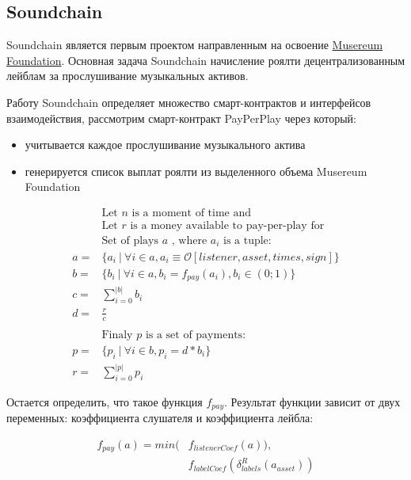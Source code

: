 \documentclass[12pt]{report}
\begin{document}
\subsection{Soundchain}
\label{tech-apps-soundchain}
\begin{multicols}{2}
Soundchain является первым проектом направленным на освоение \hyperref[tech-blockchain-reward]{Musereum Foundation}. Основная задача Soundchain начисление роялти децентрализованным лейблам за прослушивание музыкальных активов. 

Работу Soundchain определяет множество смарт-контрактов и интерфейсов взаимодействия, рассмотрим смарт-контракт PayPerPlay через который:
\begin{itemize}
	\item учитывается каждое прослушивание музыкального актива
	\item генерируется список выплат роялти из выделенного объема Musereum Foundation
\end{itemize}
\end{multicols}
\begin{equation}
\end{equation}
\begin{align*}
& \text {Let } n \text{ is a moment of time and} \\
& \text{Let } r \text{ is a money available to pay-per-play for} \\
& \text{Set of plays } a \text{ , where } a_i \text{ is a tuple:}  \\
a = &\{a_i \ | \ \forall i \in a, a_i \equiv \mathcal{O}[listener, asset, times, sign] \} \\
b = &\{b_i \ | \ \forall i \in a, b_i = f_{pay}(a_i), b_i \in (0; 1) \} \\ 
c = &\sum\limits^{|b|}_{i=0} b_i \\
d = &\frac{r}{c} \\
& \\
& \text{Finaly } p \text{ is a set of payments: } \\
p = &\{ p_i \ | \ \forall i \in b, p_i = d * b_i \} \\
r = &\sum\limits^{|p|}_{i=0} p_i
\end{align*}

Остается определить, что такое функция $f_{pay}$. Результат функции зависит от двух переменных: коэффициента слушателя и коэффициента лейбла: 

\begin{equation}
\end{equation}
\begin{align*}
f_{pay}(a) = min(&f_{listenerCoef}(a)),\\
						 &f_{labelCoef}(\delta^{R}_{labels}(a_{asset}))
\end{align*}
\end{document}
